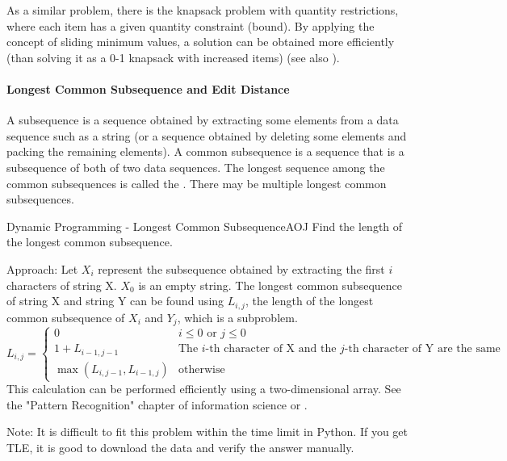 As a similar problem, there is the knapsack problem with quantity restrictions, where each item has a given quantity constraint (bound). By applying the concept of sliding minimum values, a solution can be obtained more efficiently (than solving it as a 0-1 knapsack with increased items) (see also \pccbook[p.~302]).

\paragraph{Longest Common Subsequence and Edit Distance}
A subsequence is a sequence obtained by extracting some elements from a data sequence such as a string (or a sequence obtained by deleting some elements and packing the remaining elements). A common subsequence is a sequence that is a subsequence of both of two data sequences. The longest sequence among the common subsequences is called the . There may be multiple longest common subsequences.

\begin{pbox}{Dynamic Programming - Longest Common Subsequence}{AOJ}
Find the length of the longest common subsequence.

\end{pbox}

Approach: Let $X_i$ represent the subsequence obtained by extracting the first $i$ characters of string X. $X_0$ is an empty string. The longest common subsequence of string X and string Y can be found using $L_{i,j}$, the length of the longest common subsequence of $X_i$ and $Y_j$, which is a subproblem.
\begin{equation*}
    L_{i,j} = \left\{
  \begin{array}{ll}
    0 & i \le 0 \text{ or } j \le 0\\
    1 + L_{i-1,j-1} & \text{The }i\text{-th character of X and the }j\text{-th character of Y are the same}\\
    \max(L_{i,j-1},L_{i-1,j}) & \text{otherwise}
  \end{array}\right.
\end{equation*}
This calculation can be performed efficiently using a two-dimensional array. See the "Pattern Recognition" chapter of information science or \pcaojbook[pp.~253--].

Note: It is difficult to fit this problem within the time limit in Python. If you get TLE, it is good to download the data and verify the answer manually.


